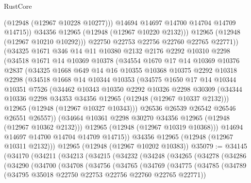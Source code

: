 \begin{lexlean}{RustCore}
\begin{coremodule}
                  (@12948 (@12967 @10228 @10277)))
                @14694
                @14697
                @14700
                @14704
                @14709
                @14715))
            @34356
            @12965
            (@12948 (@12967 @10220 @2132)))
          @12965
          (@12948 (@12967 @10210 @10292)))
        @22750
        @22753
        @22756
        @22760
        @22765
        @22771))
    (@34325
      @1671
      @346
      @14
      @11
      @10380
      @2132
      @2176
      @2292
      @10310
      @2298
      (@34518
        @1671
        @14
        @10369
        @10378
        (@34554
          @1670
          @17
          @14
          @10369
          @10376
          @2837
          (@34325
            @1668
            @649
            @14
            @16
            @10355
            @10368
            @10375
            @2292
            @10318
            @2298
            (@34518
              @1668
              @14
              @10344
              @10353
              (@34575
                @1650
                @17
                @14
                @10344
                @10351
                @7526
                (@34462
                  @10343
                  @10350
                  @2292
                  @10326
                  @2298
                  @30309
                  (@34344 @10336 @2298 @34353 @34356 @12965 (@12948 (@12967 @10337 @2132)))
                  @12965
                  (@12948 (@12967 @10327 @10343)))
                @26536
                @26539
                @26542
                @26546
                @26551
                @26557))
            (@34664 @10361 @2298 @30270 @34356 @12965 (@12948 (@12967 @10362 @2132)))
            @12965
            (@12948 (@12967 @10319 @10368)))
          @14694
          @14697
          @14700
          @14704
          @14709
          @14715))
      @34356
      @12965
      (@12948 (@12967 @10311 @2132)))
    @12965
    (@12948 (@12967 @10202 @10383))
@35079 := @34145
    (@34170
      (@34211
        (@34213
          (@34215
            (@34232
              (@34248
                (@34265
                  (@34278
                    (@34286
                      (@34290
                        (@34700
                          (@34708
                            (@34756
                              (@34765
                                (@34769
                                  (@34775
                                    (@34785
                                      (@34789
                                        (@34795 @35018 @22750 @22753 @22756 @22760 @22765 @22771))

\end{coremodule}
\end{lexlean}
